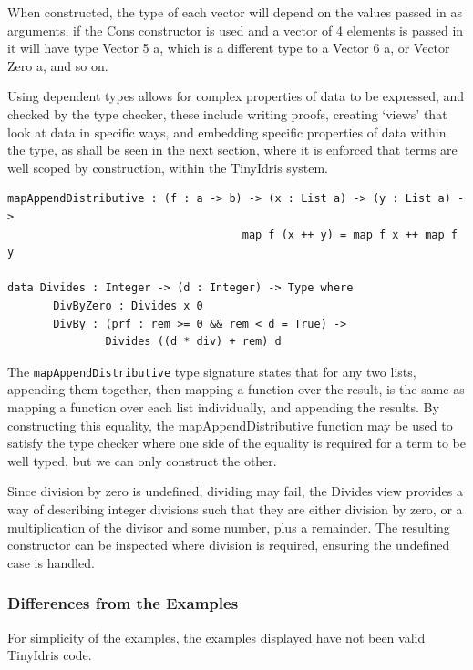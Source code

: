 \documentclass[a4paper]{article}
\begin{document}
When constructed, the type of each vector will depend on the values 
passed in as arguments, if the Cons constructor is used and a vector of 
4 elements is passed in it will have type Vector 5 a, which is a 
different type to a Vector 6 a, or Vector Zero a, and so on. 

Using dependent types allows for complex properties of data to be 
expressed, and checked by the type checker, these include writing
proofs, creating `views' that look at data in specific ways,
and embedding specific properties of data within the type, as shall be 
seen in the next section, where it is enforced that terms are well 
scoped by construction, within the TinyIdris system. 

\begin{center}
\begin{verbatim}
mapAppendDistributive : (f : a -> b) -> (x : List a) -> (y : List a) ->
						            map f (x ++ y) = map f x ++ map f y

data Divides : Integer -> (d : Integer) -> Type where
	   DivByZero : Divides x 0
	   DivBy : (prf : rem >= 0 && rem < d = True) ->
			   Divides ((d * div) + rem) d
\end{verbatim}
\end{center}

The \texttt{mapAppendDistributive} type signature states that for any
two lists, appending them together, then mapping a function over the
result, is the same as mapping a function over each list individually,
and appending the results. By constructing this equality, the
mapAppendDistributive function may be used to satisfy the type checker
where one side of the equality is required for a term to be well typed,
but we can only construct the other.

Since division by zero is undefined, dividing may fail, the Divides
view provides a way of describing integer divisions such that they
are either division by zero, or a multiplication of the divisor and some
number, plus a remainder. The resulting constructor can be inspected
where division is required, ensuring the undefined case is handled. 

\clearpage

\subsubsection{Differences from the Examples}
\label{sec:orgcd8bb18}

For simplicity of the examples, the examples displayed have not been 
valid TinyIdris code. 
\end{document}
